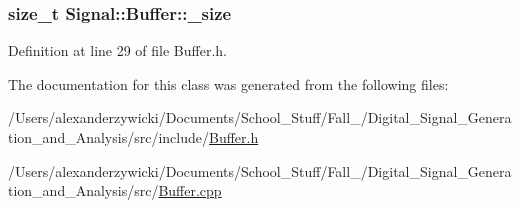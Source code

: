 \hypertarget{class_signal_1_1_buffer_ab4c8969e972323306ee51538ad70577b}{
\subsubsection[{\+\_\+size}]{\setlength{\rightskip}{0pt plus 5cm}size\+\_\+t Signal\+::\+Buffer\+::\+\_\+size\hspace{0.3cm}{\ttfamily [protected]}}}\label{class_signal_1_1_buffer_ab4c8969e972323306ee51538ad70577b}


Definition at line 29 of file Buffer.\+h.



The documentation for this class was generated from the following files\+:\begin{DoxyCompactItemize}
\item 
/\+Users/alexanderzywicki/\+Documents/\+School\+\_\+\+Stuff/\+Fall\+\_/\+Digital\+\_\+\+Signal\+\_\+\+Generation\+\_\+and\+\_\+\+Analysis/src/include/\hyperlink{_buffer_8h}{Buffer.\+h}\item 
/\+Users/alexanderzywicki/\+Documents/\+School\+\_\+\+Stuff/\+Fall\+\_/\+Digital\+\_\+\+Signal\+\_\+\+Generation\+\_\+and\+\_\+\+Analysis/src/\hyperlink{_buffer_8cpp}{Buffer.\+cpp}\end{DoxyCompactItemize}
